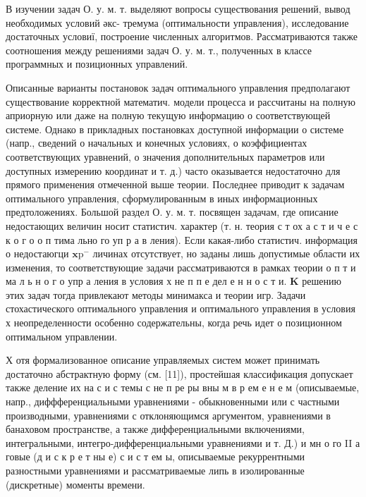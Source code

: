\documentclass[10pt]{article}
\begin{document}
В изучении задач О. у. м. т. выделяют вопросы существования решений, вывод необходимых условий әкс- тремума (оптимальности управления), исследование достаточных условиї, построение численных алгоритмов. Рассматриваются также соотношения между решениями задач О. у. м. т., полученных в классе программных и позиционных управлений.



Описанные варианты постановок задач оптимального управления предполагают существование корректной математич. модели процесса и рассчитаны на полную априорную или даже на полную текущую информацию о соответствующей системе. Однако в прикладных постановках доступной информации о системе (напр., сведений о начальных и конечных условиях, о коэффициентах соответствующих уравнений, о значения дополнительных параметров или доступных измерению координат и т. д.) часто оказывается недостаточно для прямого применения отмеченной выше теории. Последнее приводит к задачам оптимального управления, сформулированным в иных информационных предтоложениях. Большой раздел О. у. м. т. посвящен задачам, где описание недостающих величин носит статистич. характер (т. н. теория с т ох а с т и ч е с к о г о о п тима льно го уп р а в ления). Если какая-либо статистич. информация о недостаюгци $\mathbf{x} \mathrm{p}^{-}$ личинах отсутствует, но заданы лишь допустимые области их изменения, то соответствующие задачи рассматриваются в рамках теории о п т и ма л ь н о г о упр а ления в условия х не п п е дел е н н о с т и. $\boldsymbol{K}$ решению этих задач тогда привлекают методы минимакса и теории игр. Задачи стохастического оптимального управления и оптимального управления в условия х неопределенности особенно содержательны, когда речь идет о позиционном оптимальном управлении.



Х отя формализованное описание управляемых систем может принимать достаточно абстрактную форму (см. [11]), простейшая классификация допускает также деление их на с и с темы с не п ре ры вны м в р ем е н е м (описываемые, напр., диффференциальными уравнениями - обыкновенными или с частными производными, уравнениями с отклоняющимся аргументом, уравнениями в банаховом пространстве, а также дифференциальными включениями, интегральными, интегро-дифференциальными уравнениями и т. Д.) и мн о го II а говые (д и с к р е т ны е) с и с т ем ы, описываемые рекуррентными разностными уравнениями и рассматриваемые липь в изолированные (дискретные) моменты времени.
\end{document}
